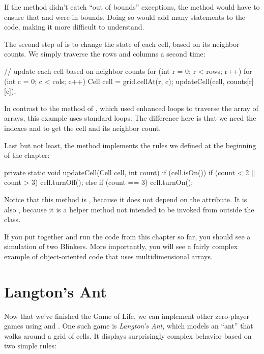 If the  method didn't catch ``out of bounds'' exceptions, the  method would have to ensure that  and  were in bounds.
Doing so would add many  statements to the code, making it more difficult to understand.

The second step of  is to change the state of each cell, based on its neighbor counts.
We simply traverse the rows and columns a second time:

\begin{code}
// update each cell based on neighbor counts
for (int r = 0; r < rows; r++) {
    for (int c = 0; c < cols; c++) {
        Cell cell = grid.cellAt(r, c);
        updateCell(cell, counts[r][c]);
    }
}
\end{code}

In contrast to the  method of , which used enhanced  loops to traverse the array of arrays, this example uses standard  loops.
The difference here is that we need the indexes  and  to get the cell and its neighbor count.

Last but not least, the  method implements the rules we defined at the beginning of the chapter:

\begin{code}
private static void updateCell(Cell cell, int count) {
    if (cell.isOn()) {
        if (count < 2 || count > 3) {
            cell.turnOff();
        }
    } else {
        if (count == 3) {
            cell.turnOn();
        }
    }
}
\end{code}

Notice that this method is , because it does not depend on the  attribute.
It is also , because it is a helper method not intended to be invoked from outside the class.

If you put together and run the code from this chapter so far, you should see a simulation of two Blinkers.
More importantly, you will see a fairly complex example of object-oriented code that uses multidimensional arrays.


\section{Langton's Ant}

Now that we've finished the Game of Life, we can implement other zero-player games using  and .
One such game is {\it Langton's Ant}, which models an ``ant'' that walks around a grid of cells.
It displays surprisingly complex behavior based on two simple rules:


